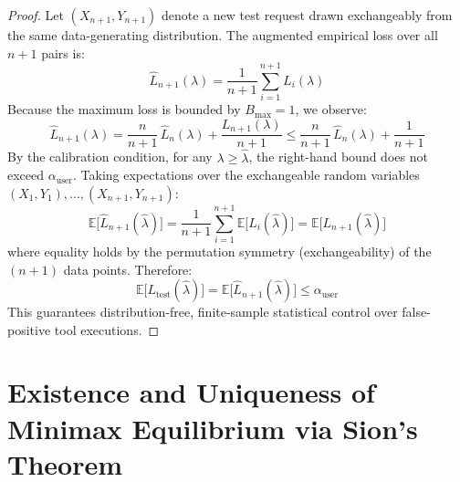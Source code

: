 \begin{proof}
Let $(X_{n+1}, Y_{n+1})$ denote a new test request drawn exchangeably from the same data-generating distribution. The augmented empirical loss over all $n+1$ pairs is:
\begin{equation}
    \hat{L}_{n+1}(\lambda) = \frac{1}{n+1} \sum_{i=1}^{n+1} L_i(\lambda)
\end{equation}
Because the maximum loss is bounded by $B_{\max} = 1$, we observe:
\begin{equation}
    \hat{L}_{n+1}(\lambda) = \frac{n}{n+1}\,\hat{L}_n(\lambda) + \frac{L_{n+1}(\lambda)}{n+1} \le \frac{n}{n+1}\,\hat{L}_n(\lambda) + \frac{1}{n+1}
\end{equation}
By the calibration condition, for any $\lambda \ge \hat{\lambda}$, the right-hand bound does not exceed $\alpha_{\mathrm{user}}$.
Taking expectations over the exchangeable random variables $(X_1, Y_1), \dots, (X_{n+1}, Y_{n+1})$:
\begin{equation}
    \mathbb{E}\big[\hat{L}_{n+1}(\hat{\lambda})\big] = \frac{1}{n+1}\sum_{i=1}^{n+1}\mathbb{E}\big[L_i(\hat{\lambda})\big] = \mathbb{E}\big[L_{n+1}(\hat{\lambda})\big]
\end{equation}
where equality holds by the permutation symmetry (exchangeability) of the $(n+1)$ data points. Therefore:
\begin{equation}
    \mathbb{E}\big[L_{\mathrm{test}}(\hat{\lambda})\big] = \mathbb{E}\big[\hat{L}_{n+1}(\hat{\lambda})\big] \le \alpha_{\mathrm{user}}
\end{equation}
This guarantees distribution-free, finite-sample statistical control over false-positive tool executions.
\end{proof}

\section{Existence and Uniqueness of Minimax Equilibrium via Sion's Theorem}
\label{app:proof_sion}

